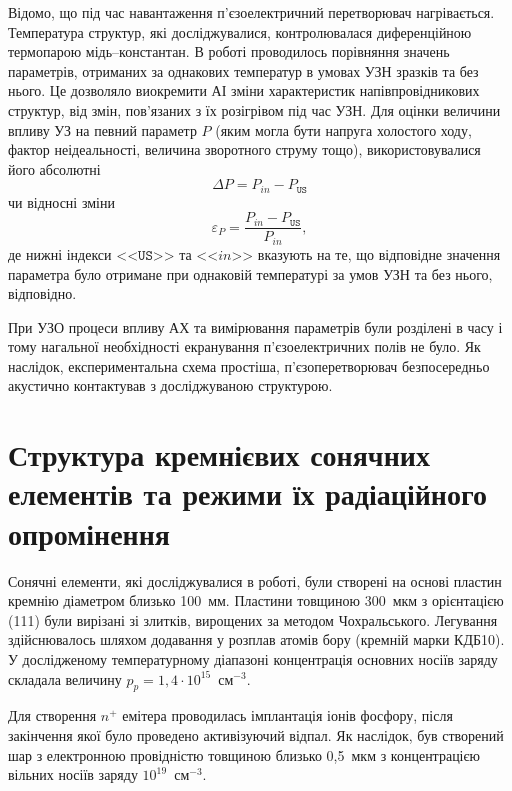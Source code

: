 Відомо, що під час навантаження п'єзоелектричний перетворювач нагрівається.
Температура структур, які досліджувалися, контролювалася диференційною термопарою мідь--константан.
В роботі проводилось порівняння значень параметрів, отриманих за однакових температур в умовах УЗН зразків та без нього.
Це дозволяло виокремити АІ зміни характеристик напівпровідникових структур, від змін, пов'язаних з їх розігрівом під час УЗН.
Для оцінки величини впливу УЗ на певний параметр $P$ (яким могла бути напруга холостого ходу, фактор неідеальності, величина зворотного струму тощо),
використовувалися його абсолютні
 \begin{equation}
 \label{eqAbsDelta}
\Delta P=P_{in}-P_\mathtt{US}
 \end{equation}
чи відносні зміни
 \begin{equation}
 \label{eqEpsDelta}
\varepsilon_P=\frac{P_{in}-P_\mathtt{US}}{P_{in}},
 \end{equation}
де нижні індекси <<$\mathtt{US}$>> та <<$in$>> вказують на те, що відповідне значення параметра було отримане при однаковій температурі за умов УЗН та без нього, відповідно.

При УЗО процеси впливу АХ та вимірювання параметрів були розділені в часу і тому нагальної необхідності екранування п'єзоелектричних полів не було.
Як наслідок, експериментальна схема простіша, п'єзоперетворювач безпосередньо акустично контактував з досліджуваною структурою.




\section{Структура кремнієвих сонячних елементів та режими їх радіаційного опромінення\label{SSC}}
Сонячні елементи, які досліджувалися в роботі, були створені на основі пластин кремнію діаметром близько 100~мм.
Пластини  товщиною 300~мкм з орієнтацією (111) були вирізані зі злитків, вирощених за методом Чохральського.
Легування здійснювалось шляхом додавання у розплав атомів бору (кремній марки КДБ10).
У дослідженому температурному діапазоні концентрація основних носіїв заряду складала величину $p_p=1,4\cdot10^{15}$~см$^{-3}$.

Для створення $n^+$ емітера проводилась імплантація іонів фосфору, після закінчення якої було проведено активізуючий відпал.
Як наслідок, був створений шар з електронною провідністю товщиною близько  0,5~мкм з концентрацією вільних носіїв заряду $10^{19}$~см$^{-3}$.

